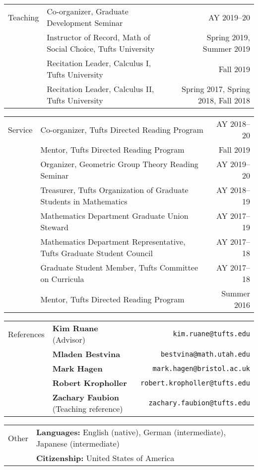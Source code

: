 \documentclass[10pt,letterpaper]{article}
\begin{document}
\begin{tabularx}{\textwidth}{HXr}
  Teaching 
  & Co-organizer, Graduate Development Seminar & AY 2019--20 \\
  & Instructor of Record, Math of Social Choice, Tufts University
  & Spring 2019, Summer 2019 \\
  & Recitation Leader, Calculus I, Tufts University & Fall 2019 \\
  & Recitation Leader, Calculus II, Tufts University & Spring 2017,
  Spring 2018, Fall 2018 \\
\end{tabularx}


\begin{tabularx}{\textwidth}{HXr}
  Service 
  & Co-organizer, Tufts Directed Reading Program & AY 2018--20 \\
  & Mentor, Tufts Directed Reading Program & Fall 2019 \\
  & Organizer, Geometric Group Theory Reading Seminar & AY 2019--20 \\
  & Treasurer, 
  Tufts Organization of Graduate Students in Mathematics
  & AY 2018--19 \\
  & Mathematics Department Graduate Union Steward
  & AY 2017--19 \\
  & Mathematics Department Representative, Tufts Graduate Student
  Council & AY 2017--18 \\
  & Graduate Student Member, Tufts Committee on Curricula & AY 2017--18 \\
  & Mentor, Tufts Directed Reading Program & Summer 2016 \\
\end{tabularx}

\begin{tabularx}{\textwidth}{HXr}
	References & \textbf{Kim Ruane} (Advisor) & \texttt{kim.ruane@tufts.edu} \\
		   & \textbf{Mladen Bestvina} & \texttt{bestvina@math.utah.edu} \\
		   & \textbf{Mark Hagen} & \texttt{mark.hagen@bristol.ac.uk} \\
		   & \textbf{Robert Kropholler} & \texttt{robert.kropholler@tufts.edu} \\
		   & \textbf{Zachary Faubion} (Teaching reference) & \texttt{zachary.faubion@tufts.edu}
\end{tabularx}

\begin{tabularx}{\textwidth}{HX}
  Other & \textbf{Languages:} English (native),
  German (intermediate), Japanese (intermediate) \\
  & \textbf{Citizenship:} United States of America
\end{tabularx}
\end{document}
